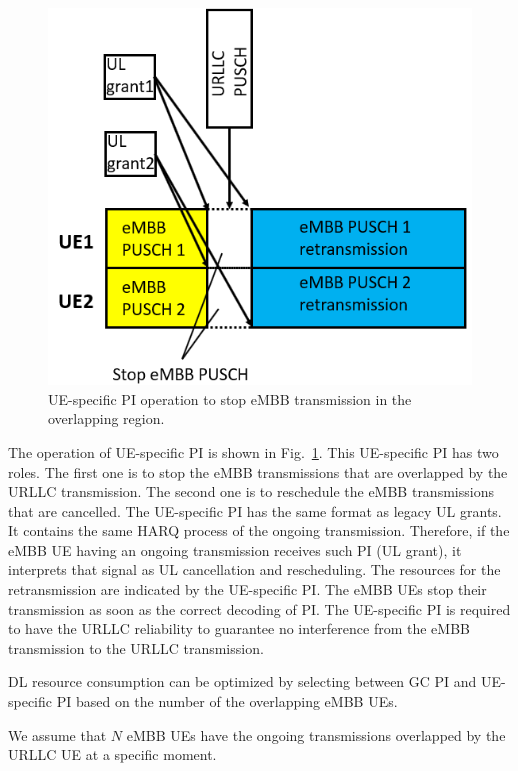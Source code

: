 \documentclass{ieeeaccess}
\begin{document}
\begin{figure}[htbp]
\centerline{\includegraphics[scale=0.4]{fig11.PNG}}
\caption{UE-specific PI operation to stop eMBB transmission in the overlapping region.}
\label{fig11}
\vspace{-2mm}
\end{figure}

The operation of UE-specific PI is shown in Fig.~\ref{fig11}. This UE-specific PI has two roles. The first one is to stop the eMBB transmissions that are overlapped by the URLLC transmission. The second one is to reschedule the eMBB transmissions that are cancelled. The UE-specific PI has the same format as legacy UL grants. It contains the same HARQ process of the ongoing transmission. Therefore, if the eMBB UE having an ongoing transmission receives such PI (UL grant), it interprets that signal as UL cancellation and rescheduling. The resources for the retransmission are indicated by the UE-specific PI. The eMBB UEs stop their transmission as soon as the correct decoding of PI. The UE-specific PI is required to have the URLLC reliability to guarantee no interference from the eMBB transmission to the URLLC transmission.

DL resource consumption can be optimized by selecting between GC PI and UE-specific PI based on the number of the overlapping eMBB UEs.

We assume that $N$ eMBB UEs have the ongoing transmissions overlapped by the URLLC UE at a specific moment. 
\end{document}
